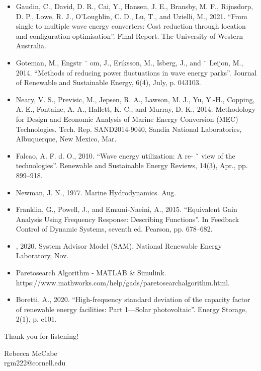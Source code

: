 \begin{frame}
\begin{itemize}
		\item [8] Gaudin, C., David, D. R., Cai, Y., Hansen, J. E., Bransby, M. F., Rijnsdorp, D. P., Lowe, R. J., O’Loughlin, C. D., Lu, T., and Uzielli, M., 2021. “From single to multiple wave energy converters: Cost reduction through location and configuration optimisation”. Final Report. The University of Western Australia.
		\item [9] Goteman, M., Engstr ¨ om, J., Eriksson, M., Isberg, J., and ¨ Leijon, M., 2014. “Methods of reducing power fluctuations in wave energy parks”. Journal of Renewable and Sustainable Energy, 6(4), July, p. 043103.
		\item [10] Neary, V. S., Previsic, M., Jepsen, R. A., Lawson, M. J., Yu, Y.-H., Copping, A. E., Fontaine, A. A., Hallett, K. C., and Murray, D. K., 2014. Methodology for Design and Economic Analysis of Marine Energy Conversion (MEC) Technologies. Tech. Rep. SAND2014-9040, Sandia National Laboratories, Albuquerque, New Mexico, Mar.
		\item [11] Falcao, A. F. d. O., 2010. “Wave energy utilization: A re- ˜ view of the technologies”. Renewable and Sustainable Energy Reviews, 14(3), Apr., pp. 899–918.
		\item [12] Newman, J. N., 1977. Marine Hydrodynamics. Aug.
		\item  [13] Franklin, G., Powell, J., and Emami-Naeini, A., 2015. “Equivalent Gain Analysis Using Frequency Response: Describing Functions”. In Feedback Control of Dynamic Systems, seventh ed. Pearson, pp. 678–682.
		\item [14] , 2020. System Advisor Model (SAM). National Renewable Energy Laboratory, Nov.
		\item [15] Paretosearch Algorithm - MATLAB \& Simulink. https://www.mathworks.com/help/gads/paretosearchalgorithm.html.
		\item [16] Boretti, A., 2020. “High-frequency standard deviation of the capacity factor of renewable energy facilities: Part 1—Solar photovoltaic”. Energy Storage, 2(1), p. e101.
	\end{itemize}
\end{frame}


\begin{frame}
	\begin{center}
		{\large\color{titleText} Thank you for listening!}
		\vspace{1cm}
		
		Rebecca McCabe \\[1em]
		rgm222@cornell.edu \\
	\end{center}
\end{frame}



